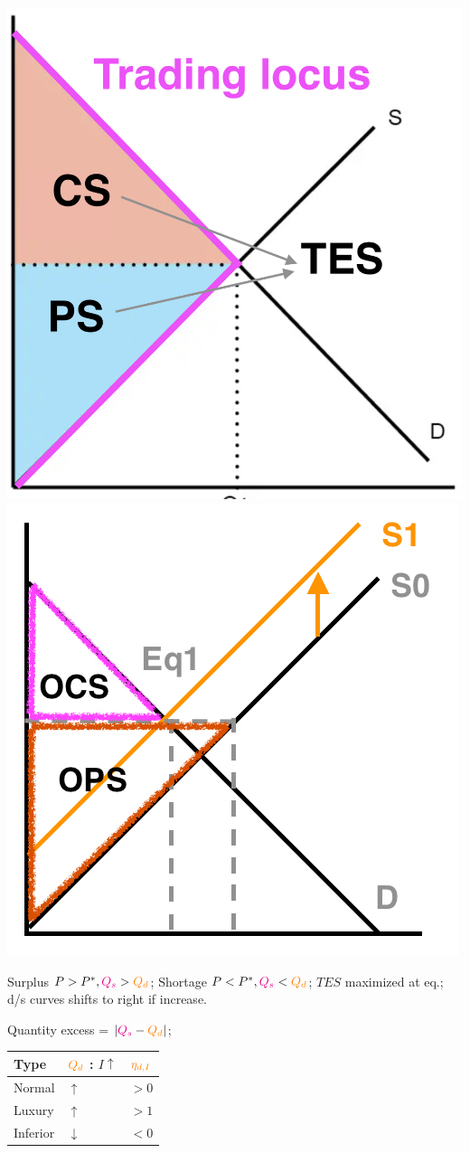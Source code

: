 \documentclass[a4paper]{article}
\begin{document}
\begin{multicols*}{3}
    \begin{minipage}{\linewidth}
        \includegraphics[width=0.48\linewidth]{./csps.png}
        \includegraphics[width=0.48\linewidth]{./csps2.jpg}
    \end{minipage}

    Surplus $P > P^*, \textcolor{magenta}{Q_s} > \textcolor{orange}{Q_d}$; Shortage $P < P^*, \textcolor{magenta}{Q_s} < \textcolor{orange}{Q_d}$; $TES$ maximized at eq.; d/s curves shifts to right if increase.

    Quantity excess = $|\textcolor{magenta}{Q_s} - \textcolor{orange}{Q_d}|$;

    \begin{minipage}{\linewidth}
        \begin{tabular}{l|l|l}
            Type     & $\textcolor{orange}{Q_d}$ : $I \uparrow$ & $\textcolor{orange}{\eta_{d,I}}$ \\
            \hline
            Normal   & $\uparrow$                               & $>0$                             \\
            Luxury   & $\uparrow$                               & $>1$                             \\
            Inferior & $\downarrow$                             & $<0$                             \\
        \end{tabular}
    \end{minipage}


\end{multicols*}
\end{document}
